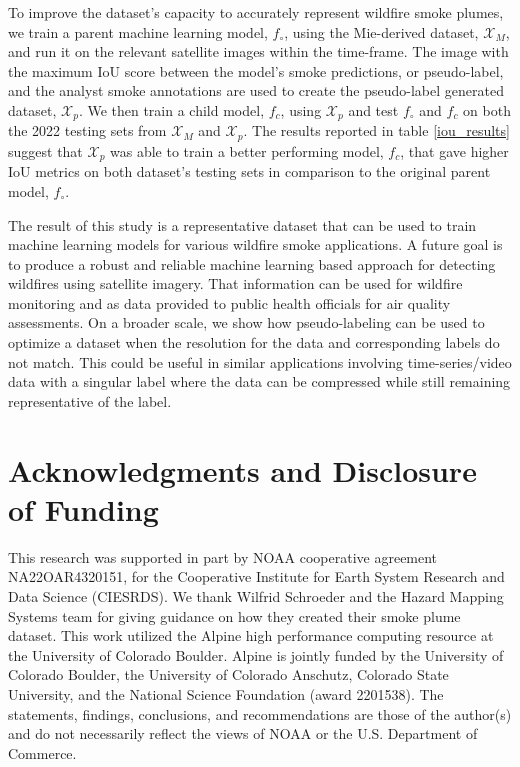 \documentclass{article}
\begin{document}
To improve the dataset's capacity to accurately represent wildfire smoke plumes, we train a parent machine learning model, \(f_{\circ}\), using the Mie-derived dataset, \(\mathcal{X}_M\), and run it on the relevant satellite images within the time-frame. The image with the maximum IoU score between the model's smoke predictions, or pseudo-label, and the analyst smoke annotations are used to create the pseudo-label generated dataset, \(\mathcal{X}_{p}\). We then train a child model, \(f_c\), using \(\mathcal{X}_{p}\) and test \(f_{\circ}\) and \(f_c\) on both the 2022 testing sets from \(\mathcal{X}_{M}\) and \(\mathcal{X}_{p}\). The results reported in table \ref{iou_results} suggest that \(\mathcal{X}_{p}\) was able to train a better performing model, \(f_c\), that gave higher IoU metrics on both dataset's testing sets in comparison to the original parent model, \(f_{\circ}\).

The result of this study is a representative dataset that can be used to train machine learning models for various wildfire smoke applications. A future goal is to produce a robust and reliable machine learning based approach for detecting wildfires using satellite imagery. That information can be used for wildfire monitoring and as data provided to public health officials for air quality assessments. On a broader scale, we show how pseudo-labeling can be used to optimize a dataset when the resolution for the data and corresponding labels do not match. This could be useful in similar applications involving time-series/video data with a singular label where the data can be compressed while still remaining representative of the label. 

\section{Acknowledgments and Disclosure of Funding}

This research was supported in part by NOAA cooperative agreement NA22OAR4320151, for the Cooperative Institute for Earth System Research and Data Science (CIESRDS). We thank Wilfrid Schroeder and the Hazard Mapping Systems team for giving guidance on how they created their smoke plume dataset. This work utilized the Alpine high performance computing resource at the University of Colorado Boulder. Alpine is jointly funded by the University of Colorado Boulder, the University of Colorado Anschutz, Colorado State University, and the National Science Foundation (award 2201538). The statements, findings, conclusions, and recommendations are those of the author(s) and do not necessarily reflect the views of NOAA or the U.S. Department of Commerce. 
\end{document}
